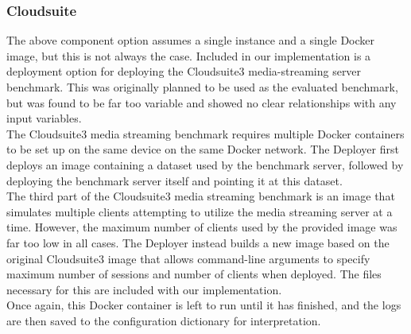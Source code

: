 \documentclass{report}
\begin{document}
\subsubsection{Cloudsuite}
The above component option assumes a single instance and a single Docker image, but this is not always the case. Included in our implementation is a deployment option for deploying the Cloudsuite3\cite{Palit2016} media-streaming server benchmark. This was originally planned to be used as the evaluated benchmark, but was found to be far too variable and showed no clear relationships with any input variables. \\
The Cloudsuite3 media streaming benchmark requires multiple Docker containers to be set up on the same device on the same Docker network. The Deployer first deploys an image containing a dataset used by the benchmark server, followed by deploying the benchmark server itself and pointing it at this dataset. \\
The third part of the Cloudsuite3 media streaming benchmark is an image that simulates multiple clients attempting to utilize the media streaming server at a time. However, the maximum number of clients used by the provided image was far too low in all cases. The Deployer instead builds a new image based on the original Cloudsuite3 image that allows command-line arguments to specify maximum number of sessions and number of clients when deployed. The files necessary for this are included with our implementation.\\
Once again, this Docker container is left to run until it has finished, and the logs are then saved to the configuration dictionary for interpretation.
 
\end{document}
